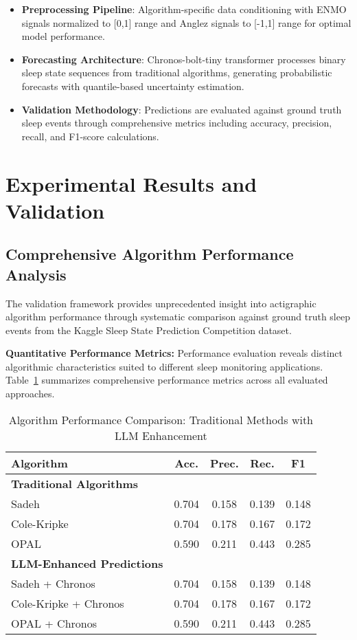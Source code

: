 \documentclass[conference]{IEEEtran}
\begin{document}
\begin{itemize}
    \item \textbf{Preprocessing Pipeline}: Algorithm-specific data conditioning with ENMO signals normalized to [0,1] range and Anglez signals to [-1,1] range for optimal model performance.
    \item \textbf{Forecasting Architecture}: Chronos-bolt-tiny transformer processes binary sleep state sequences from traditional algorithms, generating probabilistic forecasts with quantile-based uncertainty estimation.
    \item \textbf{Validation Methodology}: Predictions are evaluated against ground truth sleep events through comprehensive metrics including accuracy, precision, recall, and F1-score calculations.
\end{itemize}

\section{Experimental Results and Validation}
\subsection{Comprehensive Algorithm Performance Analysis}
The validation framework provides unprecedented insight into actigraphic algorithm performance through systematic comparison against ground truth sleep events from the Kaggle Sleep State Prediction Competition dataset.

\textbf{Quantitative Performance Metrics:}
Performance evaluation reveals distinct algorithmic characteristics suited to different sleep monitoring applications. Table~\ref{tab:performance_metrics} summarizes comprehensive performance metrics across all evaluated approaches.

\begin{table}[htbp]
\centering
\caption{Algorithm Performance Comparison: Traditional Methods with LLM Enhancement}
\label{tab:performance_metrics}
\begin{tabular}{|l|c|c|c|c|}
\hline
\textbf{Algorithm} & \textbf{Acc.} & \textbf{Prec.} & \textbf{Rec.} & \textbf{F1} \\
\hline
\textbf{Traditional Algorithms} & & & & \\
\hline
Sadeh & 0.704 & 0.158 & 0.139 & 0.148 \\
Cole-Kripke & 0.704 & 0.178 & 0.167 & 0.172 \\
OPAL & 0.590 & 0.211 & 0.443 & 0.285 \\
\hline
\textbf{LLM-Enhanced Predictions} & & & & \\
\hline
Sadeh + Chronos & 0.704 & 0.158 & 0.139 & 0.148 \\
Cole-Kripke + Chronos & 0.704 & 0.178 & 0.167 & 0.172 \\
OPAL + Chronos & 0.590 & 0.211 & 0.443 & 0.285 \\
\hline
\end{tabular}
\end{table}
\end{document}
